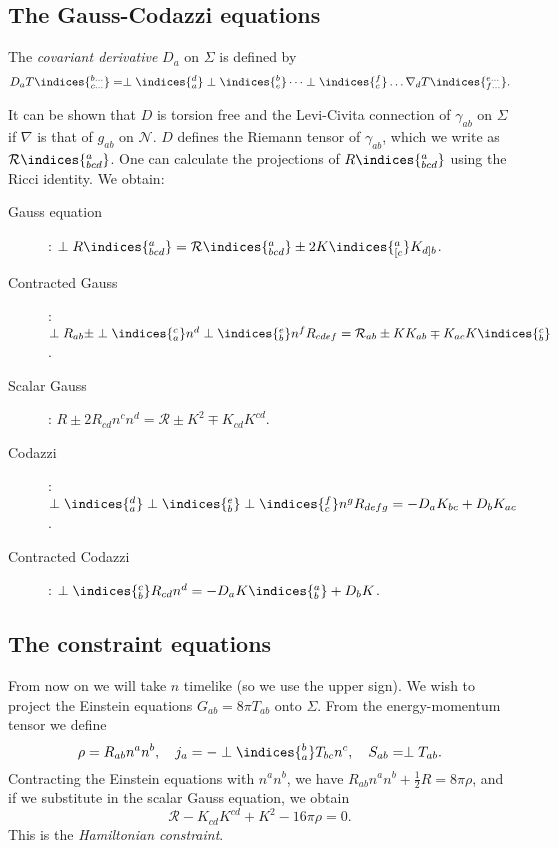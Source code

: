 \documentclass{jknotes}
\begin{document}
\subsection{The Gauss-Codazzi equations}
\begin{defn}
    The \emph{covariant derivative} \(D_a\) on \(\Sigma\) is defined by
    \begin{equation}
        D_a T\indices{^{b\dots}_{c\dots}} = \perp\indices{^d_a}\perp\indices{^b_e}\dots\perp\indices{^f_c}\dots\nabla_d T\indices{^{e\dots}_{f\dots}}.
    \end{equation}
\end{defn}
It can be shown that \(D\) is torsion free and the Levi-Civita connection of \(\gamma_{ab}\) on \(\Sigma\) if \(\nabla\) is that of \(g_{ab}\) on \(\mathcal{N}\). \(D\) defines the Riemann tensor of \(\gamma_{ab}\), which we write as \(\mathcal{R}\indices{^a_{bcd}}\). One can calculate the projections of \(R\indices{^a_{bcd}}\) using the Ricci identity. We obtain:
\begin{description}
    \item[Gauss equation]: \(\perp R\indices{^a_{bcd}} = \mathcal{R}\indices{^a_{bcd}} \pm 2K\indices{^a_{[c}}K_{d]b}\). 
    \item[Contracted Gauss]: \(\perp R_{ab} \pm \perp\indices{^c_a}n^d\perp\indices{^e_b}n^fR_{cdef} = \mathcal{R}_{ab} \pm KK_{ab}\mp K_{ac}K\indices{^c_b}\).
    \item[Scalar Gauss]: \(R\pm2R_{cd}n^cn^d = \mathcal{R} \pm K^2 \mp K_{cd}K^{cd}\).
    \item[Codazzi]: \(\perp\indices{^d_a}\perp\indices{^e_b}\perp\indices{^f_c}n^gR_{defg} = -D_aK_{bc} + D_bK_{ac}\).
    \item[Contracted Codazzi]: \(\perp\indices{^c_b}R_{cd}n^d = -D_a K\indices{^a_b} + D_bK\).
\end{description}

\subsection{The constraint equations}
From now on we will take \(n\) timelike (so we use the upper sign). We wish to project the Einstein equations \(G_{ab} = 8\pi T_{ab}\) onto \(\Sigma\). From the energy-momentum tensor we define
\begin{equation}
    \rho = R_{ab}n^an^b,\quad j_a = -\perp\indices{^b_a}T_{bc}n^c,\quad S_{ab} = \perp T_{ab}.
\end{equation}
Contracting the Einstein equations with \(n^an^b\), we have \(R_{ab} n^an^b+\frac12 R=8\pi\rho\), and if we substitute in the scalar Gauss equation, we obtain
\begin{equation}
    \mathcal{R}-K_{cd}K^{cd}+K^2-16\pi\rho=0.
\end{equation}
This is the \emph{Hamiltonian constraint}.
\end{document}
